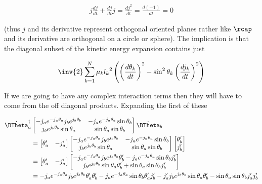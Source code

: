 \begin{align}\label{eqn:sPolarMultiPendulum:moo2}
j \frac{dj}{dt} + \frac{dj}{dt} j = \frac{d j^2}{dt} = \frac{d (-1)}{dt} = 0
\end{align}

(thus $j$ and its derivative represent orthogonal oriented planes rather like $\rcap$ and its derivative are orthogonal on a circle or sphere).  The implication is that the diagonal subset of the kinetic energy expansion contains just

\begin{align}\label{eqn:sPolarMultiPendulum:moo3}
\inv{2}
\sum_{k=1}^N
\mu_k
{l_k}^2
\left(
\left(\frac{d\theta_k}{dt}\right)^2 -\sin^2\theta_k \left(\frac{d j_k}{dt}\right)^2  \right)
\end{align}

If we are going to have any complex interaction terms then they will have to come from the off diagonal products.  Expanding the first of these

\begin{align*}
{\dot{\BTheta}_a}^\dagger
&\begin{bmatrix}
- j_a e^{-j_a \theta_a} j_b e^{j_b\theta_b} & - j_a e^{-j_a \theta_a} \sin\theta_b \\
j_b e^{j_b \theta_b} \sin\theta_a & \sin\theta_a \sin\theta_b
\end{bmatrix}
\dot{\BTheta}_b \\
&=
\begin{bmatrix}
\theta_a' & -j_a'
\end{bmatrix}
\begin{bmatrix}
- j_a e^{-j_a \theta_a} j_b e^{j_b\theta_b} & - j_a e^{-j_a \theta_a} \sin\theta_b \\
j_b e^{j_b \theta_b} \sin\theta_a & \sin\theta_a \sin\theta_b
\end{bmatrix}
\begin{bmatrix}
\theta_b' \\
j_b'
\end{bmatrix} \\
&=
\begin{bmatrix}
\theta_a' & -j_a'
\end{bmatrix}
\begin{bmatrix}
- j_a e^{-j_a \theta_a} j_b e^{j_b\theta_b} \theta_b' - j_a e^{-j_a \theta_a} \sin\theta_b j_b' \\
j_b e^{j_b \theta_b} \sin\theta_a \theta_b' + \sin\theta_a \sin\theta_b j_b'
\end{bmatrix} \\
&=
- j_a e^{-j_a \theta_a} j_b e^{j_b\theta_b} \theta_a' \theta_b' - j_a e^{-j_a \theta_a} \sin\theta_b \theta_a' j_b' -j_a' j_b e^{j_b \theta_b} \sin\theta_a \theta_b' - \sin\theta_a \sin\theta_b j_a' j_b'
\end{align*}

